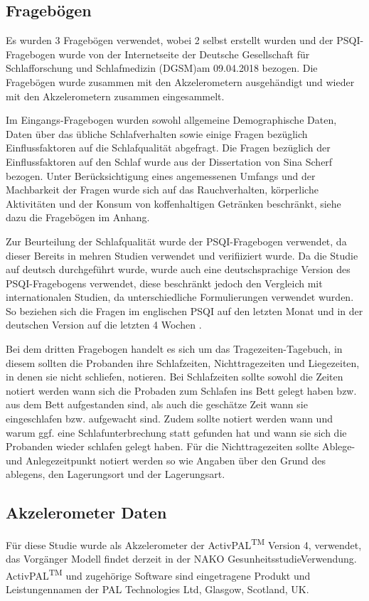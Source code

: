\subsection{Fragebögen}
Es wurden 3 Fragebögen verwendet, wobei 2 selbst erstellt wurden und der PSQI-Fragebogen wurde von der Internetseite der \glqq Deutsche Gesellschaft für Schlafforschung und Schlafmedizin (DGSM)\grqq am 09.04.2018 bezogen. Die Fragebögen wurde zusammen mit den Akzelerometern ausgehändigt und wieder mit den Akzelerometern zusammen eingesammelt.

Im Eingangs-Fragebogen wurden sowohl allgemeine Demographische Daten, Daten über das übliche Schlafverhalten sowie einige Fragen bezüglich Einflussfaktoren auf die Schlafqualität abgefragt. Die Fragen bezüglich der Einflussfaktoren auf den Schlaf wurde aus der Dissertation von Sina Scherf \cite{Scherf} bezogen. Unter Berücksichtigung eines angemessenen Umfangs und der Machbarkeit der Fragen wurde sich auf das Rauchverhalten, körperliche Aktivitäten und der Konsum von koffenhaltigen Getränken beschränkt, siehe dazu die Fragebögen im Anhang.

Zur Beurteilung der Schlafqualität wurde der PSQI-Fragebogen verwendet, da dieser Bereits in mehren Studien verwendet und verifiiziert wurde. Da die Studie auf deutsch durchgeführt wurde, wurde auch eine deutschsprachige Version des PSQI-Fragebogens verwendet, diese beschränkt jedoch den Vergleich mit internationalen Studien, da unterschiedliche Formulierungen verwendet wurden. So beziehen sich die Fragen im englischen PSQI auf den letzten Monat und in der deutschen Version auf die letzten 4 Wochen \cite{PSQItest}.

Bei dem dritten Fragebogen handelt es sich um das Tragezeiten-Tagebuch, in diesem sollten die Probanden ihre Schlafzeiten, Nichttragezeiten und Liegezeiten, in denen sie nicht schliefen, notieren. Bei Schlafzeiten sollte sowohl die Zeiten notiert werden wann sich die Probaden zum Schlafen ins Bett gelegt haben bzw. aus dem Bett aufgestanden sind, als auch die geschätze Zeit wann sie eingeschlafen bzw. aufgewacht sind. Zudem sollte notiert werden wann und warum ggf. eine Schlafunterbrechung statt gefunden hat und wann sie sich die Probanden wieder schlafen gelegt haben. Für die Nichttragezeiten sollte Ablege- und Anlegezeitpunkt notiert werden so wie Angaben über den Grund des ablegens, den Lagerungsort und der Lagerungsart.



\subsection{Akzelerometer Daten}
Für diese Studie wurde als Akzelerometer der ActivPAL\textsuperscript{TM} Version 4, verwendet, das Vorgänger Modell findet derzeit in der \glqq  NAKO Gesunheitsstudie\grqq Verwendung. ActivPAL\textsuperscript{TM} und zugehörige Software sind eingetragene Produkt und Leistungennamen der PAL Technologies Ltd, Glasgow, Scotland, UK.\\

